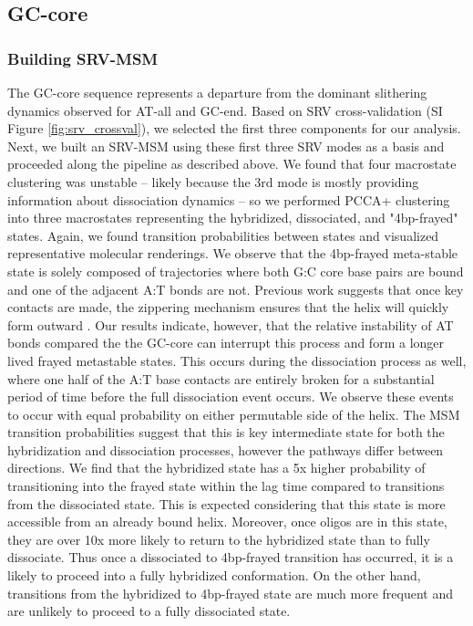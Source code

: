 \documentclass[journal=jpcbfk,manuscript=article]{achemso}
\begin{document}

\subsection{\label{sec:Results}GC-core}

\subsubsection{\label{sec:Results}Building SRV-MSM}

The GC-core sequence represents a departure from the dominant slithering dynamics observed for AT-all and GC-end. Based on SRV cross-validation (SI Figure \ref{fig:srv_crossval}), we selected the first three components for our analysis. Next, we built an SRV-MSM using these first three SRV modes as a basis and proceeded along the pipeline as described above. We found that four macrostate clustering was unstable -- likely because the 3rd mode is mostly providing  information about dissociation dynamics -- so we performed PCCA+ clustering into three macrostates representing the hybridized, dissociated, and "4bp-frayed" states. Again, we found transition probabilities between states and visualized representative molecular renderings. We observe that the 4bp-frayed meta-stable state is solely composed of trajectories where both G:C core base pairs are bound and one of the adjacent A:T bonds are not. Previous work suggests that once key contacts are made, the zippering mechanism ensures that the helix will quickly form outward \citep{Romano2013DNADependence, Yin2011KineticsHybridization}. Our results indicate, however, that the relative instability of AT bonds compared the the GC-core can interrupt this process and form a longer lived frayed metastable states. This occurs during the dissociation process as well, where one half of the A:T base contacts are entirely broken for a substantial period of time before the full dissociation event occurs. We observe these events to occur with equal probability on either permutable side of the helix. The MSM transition probabilities suggest that this is key intermediate state for both the hybridization and dissociation processes, however the pathways differ between directions. We find that the hybridized state has a 5x higher probability of transitioning into the frayed state within the lag time compared to transitions from the dissociated state. This is expected considering that this state is more accessible from an already bound helix. Moreover, once oligos are in this state, they are over 10x more likely to return to the hybridized state than to fully dissociate. Thus once a dissociated to 4bp-frayed transition has occurred, it is a likely to proceed into a fully hybridized conformation. On the other hand, transitions from the hybridized to 4bp-frayed state are much more frequent and are unlikely to proceed to a fully dissociated state.
\end{document}
